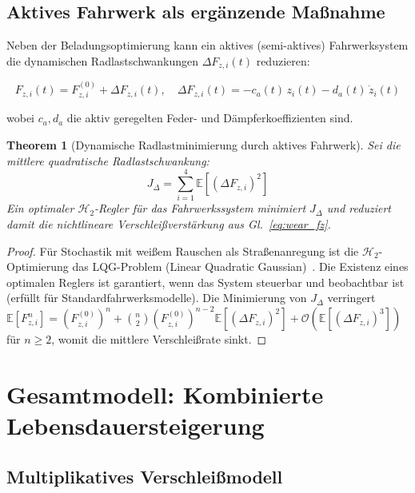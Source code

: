 ﻿\documentclass[12pt,a4paper]{article}
\newtheorem{theorem}{Theorem}[section]
\theoremstyle{definition}
\theoremstyle{remark}
\begin{document}
\subsection{Aktives Fahrwerk als ergänzende Maßnahme}

Neben der Beladungsoptimierung kann ein aktives (semi-aktives) Fahrwerksystem die
dynamischen Radlastschwankungen $\Delta F_{z,i}(t)$ reduzieren:

\begin{equation}
  F_{z,i}(t) = F_{z,i}^{(0)} + \Delta F_{z,i}(t), \quad
  \Delta F_{z,i}(t) = -c_a(t)\,z_i(t) - d_a(t)\,\dot{z}_i(t)
\end{equation}

wobei $c_a, d_a$ die aktiv geregelten Feder- und Dämpferkoeffizienten sind.

\begin{theorem}[Dynamische Radlastminimierung durch aktives Fahrwerk]
\label{thm:active_suspension}
Sei die mittlere quadratische Radlastschwankung:
\begin{equation}
  J_\Delta = \sum_{i=1}^4 \mathbb{E}\!\left[(\Delta F_{z,i})^2\right]
\end{equation}
Ein optimaler $\mathcal{H}_2$-Regler für das Fahrwerkssystem minimiert $J_\Delta$
und reduziert damit die nichtlineare Verschleißverstärkung aus Gl.~\eqref{eq:wear_fz}.
\end{theorem}

\begin{proof}
Für Stochastik mit weißem Rauschen als Straßenanregung ist die $\mathcal{H}_2$-Optimierung
das LQG-Problem (Linear Quadratic Gaussian)~\cite{Anderson1990}. Die Existenz eines
optimalen Reglers ist garantiert, wenn das System steuerbar und beobachtbar ist
(erfüllt für Standardfahrwerksmodelle). Die Minimierung von $J_\Delta$ verringert
$\mathbb{E}[F_{z,i}^n] = (F_{z,i}^{(0)})^n + \binom{n}{2}(F_{z,i}^{(0)})^{n-2}\mathbb{E}[(\Delta F_{z,i})^2]
+ \mathcal{O}(\mathbb{E}[(\Delta F_{z,i})^3])$ für $n \geq 2$, womit die mittlere
Verschleißrate sinkt.
\end{proof}

\section{Gesamtmodell: Kombinierte Lebensdauersteigerung}
\label{sec:gesamtmodell}

\subsection{Multiplikatives Verschleißmodell}
\end{document}
